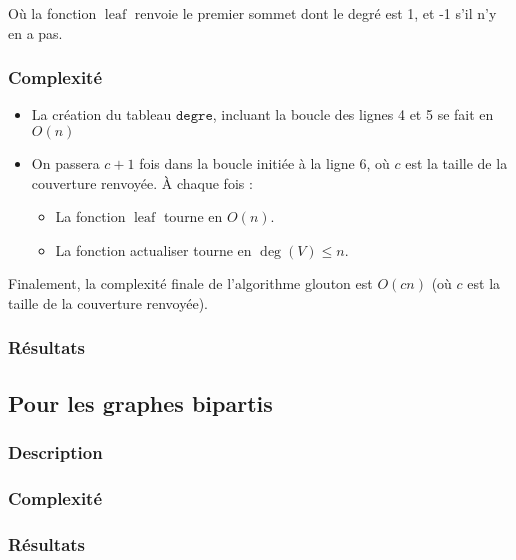 \documentclass[a4paper,10pt]{article}
\newcommand*{\itemb}{\item[$\bullet$]}
\newcommand*{\itemt}{\item[$\blacktriangleright$]}
\DeclareMathOperator{\leaf}{leaf}
\begin{document}
Où la fonction $\leaf$ renvoie le premier sommet dont le degré est 1, et -1 s'il n'y en a pas.

\subsubsection{Complexité}

\begin{itemize}
 \itemb La création du tableau $\mathtt{degre}$, incluant la boucle des lignes 4 et 5 se fait en $O(n)$
 \itemb On passera $c+1$ fois dans la boucle initiée à la ligne 6, où $c$ est la taille de la couverture renvoyée. À chaque fois :
\begin{itemize}
\itemt La fonction $\leaf$ tourne en $O(n)$.
\itemt La fonction actualiser tourne en $\deg(V)\leqslant n$.
\end{itemize}
\end{itemize}

Finalement, la complexité finale de l'algorithme glouton est $O(cn)$ (où $c$ est la taille de la couverture renvoyée).

\subsubsection{Résultats}

\subsection{Pour les graphes bipartis}

\subsubsection{Description}


\subsubsection{Complexité}


\subsubsection{Résultats}
\end{document}
